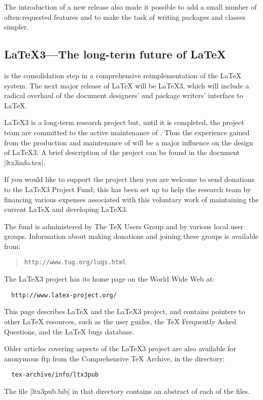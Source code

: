 \documentclass{ltxguide}[2001/05/28]
\begin{document}
The introduction of a new release also made it possible to add a small
number of often-requested features and to make the task of writing
packages and classes simpler.

\subsection{\LaTeX3---The long-term future of \LaTeX}
\label{Sec:ltx3}

\LaTeXe{} is the consolidation step in a comprehensive
reimplementation of the \LaTeX{} system.  The next major release of
\LaTeX{} will be \LaTeX3, which will include a radical overhaul of the
document designers' and package writers' interface to \LaTeX.

\LaTeX3 is a long-term research project but, until it is completed,
the project team are committed to the active maintenance of \LaTeXe{}.
Thus the experience gained from the production and maintenance of
\LaTeXe{} will be a major influence on the design of \LaTeX3.
A brief description of the project can be found in the document
|ltx3info.tex|.

If you would like to support the project then you are welcome to send
donations to the \LaTeX3 Project Fund; this has been set up to help
the research team by financing various expenses associated with this
voluntary work of maintaining the current \LaTeX{} and developing
\LaTeX3.

The fund is administered by The \TeX{} Users Group and by various
local user groups.  Information about making donations and joining
these groups is available from:
\begin{quote}\small\label{addrs}
   \texttt{http://www.tug.org/lugs.html}
\end{quote}

The \LaTeX3{} project has its home page
on the World Wide Web at:
\begin{verbatim}
  http://www.latex-project.org/
\end{verbatim}
This page describes \LaTeX{} and the \LaTeX3 project, and contains
pointers to other \LaTeX{} resources, such as the user guides, the
\TeX{} Frequently Asked Questions, and the \LaTeX{} bugs database.

Older articles covering aspects of the \LaTeX3 project are also
available for anonymous ftp from the Comprehensive \TeX{} Archive, in
the directory:
\begin{verbatim}
  tex-archive/info/ltx3pub
\end{verbatim}
The file |ltx3pub.bib| in that directory contains an abstract of each
of the files.
\end{document}
